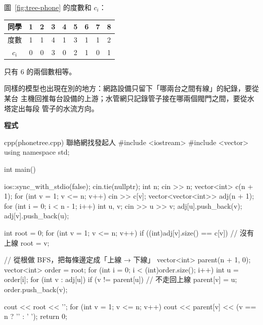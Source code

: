 圖~\ref{fig:tree-phone} 的度數和 $c_i$：

\begin{center}
\begin{tabular}{c|cccccccc}
\toprule
同學 & 1 & 2 & 3 & 4 & 5 & 6 & 7 & 8 \\
\midrule
度數 & 1 & 1 & 4 & 1 & 3 & 1 & 1 & 2 \\
$c_i$ & 0 & 0 & 3 & 0 & 2 & 1 & 0 & 1 \\
\bottomrule
\end{tabular}
\end{center}

只有 $6$ 的兩個數相等。

同樣的模型也出現在別的地方：網路設備只留下「哪兩台之間有線」的紀錄，要從某台
主機回推每台設備的上游；水管網只記錄管子接在哪兩個閥門之間，要從水塔定出每段
管子的水流方向。

\textbf{程式}

\begin{example}[label=ex:phonetree]{cpp}{(phonetree.cpp) 聯絡網找發起人}
#include <iostream>
#include <vector>
using namespace std;

int main() {
    ios::sync_with_stdio(false);
    cin.tie(nullptr);
    int n;
    cin >> n;
    vector<int> c(n + 1);
    for (int v = 1; v <= n; v++) {
        cin >> c[v];
    }
    vector<vector<int>> adj(n + 1);
    for (int i = 0; i < n - 1; i++) {
        int u, v;
        cin >> u >> v;
        adj[u].push_back(v);
        adj[v].push_back(u);
    }

    int root = 0;
    for (int v = 1; v <= n; v++) {
        if ((int)adj[v].size() == c[v]) {   // 沒有上線
            root = v;
        }
    }

    // 從根做 BFS，把每條邊定成「上線 → 下線」
    vector<int> parent(n + 1, 0);
    vector<int> order = {root};
    for (int i = 0; i < (int)order.size(); i++) {
        int u = order[i];
        for (int v : adj[u]) {
            if (v != parent[u]) {           // 不走回上線
                parent[v] = u;
                order.push_back(v);
            }
        }
    }

    cout << root << '\n';
    for (int v = 1; v <= n; v++) {
        cout << parent[v] << (v == n ? '\n' : ' ');
    }
    return 0;
}
\end{example}


